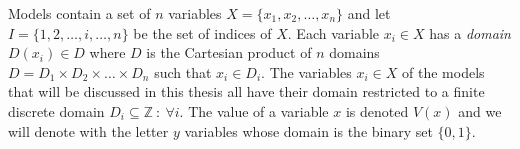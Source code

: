 Models contain a set of $n$ variables $X = \{ x_1, x_2, \dots , x_n \} $ and let $I = \{1,2,\dots, i, \dots , n\}$ be 
the set of 
indices of $X$. Each variable $x_i \in X$ has a \emph{domain} $D(x_i) \in D$ where $D$ is the Cartesian product of $n$ 
domains $D =  D_1 \times D_2 \times \dots\times D_n $ such that $x_i \in D_i$. The variables $x_i \in X$ of the models 
that will be discussed in this thesis all have their domain restricted to a finite discrete domain $D_i \subseteq 
\mathbb{Z}\ : \: \forall i$. The value of a variable $x$ is denoted $V(x)$ and 
we will denote with the letter $y$ variables whose domain is the binary set $\{0,1\}$. 